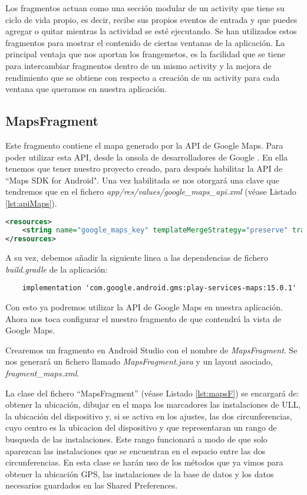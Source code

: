 Los fragmentos \cite{URL::fragment} actuan como una sección modular de un activity que tiene su ciclo de vida propio, es decir, recibe sus propios eventos de entrada y que puedes agregar o quitar mientras la actividad se esté ejecutando. Se han utilizados estos fragmentos para mostrar el contenido de ciertas ventanas de la aplicación. La principal ventaja que nos aportan los frangemetos, es la facilidad que se tiene para intercambiar fragmentos dentro de un mismo activity y la mejora de rendimiento que se obtiene con respecto a creación de un activity para cada ventana que queramos en nuestra aplicación.

\subsection{MapsFragment}
       
Este fragmento contiene el mapa generado por la API de Google Maps. Para poder utilizar esta API, desde la onsola de desarrolladores de Google \cite{URL::consoleGoogle}. En ella tenemos que tener nuestro proyecto creado, para después habilitar la API de ``Maps SDK for Android". Una vez habilitada se nos otorgará una clave que tendremos que en el fichero \textit{app/res/values/google\_maps\_api.xml} (véase Listado \ref{lst:apiMaps}).

\begin{lstlisting}[stringstyle=\color{purple},language=XML,caption={Fichero \textit{google\_maps\_api.xml}.},  label={lst:apiMaps}]
<resources>
    <string name="google_maps_key" templateMergeStrategy="preserve" translatable="false">API_Maps</string>
</resources>
\end{lstlisting}
 
A su vez, debemos añadir la siguiente linea a las dependencias de fichero \textit{build.gradle} de la aplicación:
 
\begin{lstlisting}
    implementation 'com.google.android.gms:play-services-maps:15.0.1'
\end{lstlisting}

Con esto ya podremos utilizar la API de Google Maps en nuestra aplicación. Ahora nos toca configurar el nuestro fragmento de que contendrá la vista de Google Maps. 

Crearemos un fragmento en Android Studio con el nombre de \textit{MapsFragment}. Se nos generará un fichero llamado \textit{MapsFragment.java} y un layout asociado, \textit{fragment\_maps.xml}.

La clase del fichero ``MapsFragment'' (véase Listado \ref{lst:mapsF}) se encargará de: obtener la ubicación, dibujar en el mapa los marcadores las instalaciones de ULL, la ubicación del dispositivo y, si se activa en los ajustes, las dos circunferencias, cuyo centro es la ubicacion del dispositivo y que representaran un rango de busqueda de las instalaciones. Este rango funcionará a modo de que solo aparezcan las instalaciones que se encuentran en el espacio entre las dos circunferencias. En esta clase se harán uso de los métodos que ya vimos para obtener la ubicación GPS, las instalaciones de la base de datos y los datos necesarios guardados en las Shared Preferences.   


